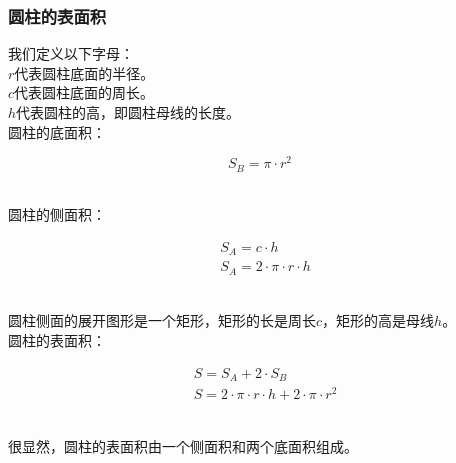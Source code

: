 \documentclass[UTF8]{ctexart}
\begin{document}
\subsubsection{圆柱的表面积}
    我们定义以下字母：\\[3mm]
    $r$代表圆柱底面的半径。\\[3mm]
    $c$代表圆柱底面的周长。\\[3mm]
    $h$代表圆柱的高，即圆柱母线的长度。\\[6mm]
    圆柱的底面积：
    \begin{large}
        \begin{equation*}
            S_B=\pi\cdot r^2
        \end{equation*}
    \end{large}\\
    圆柱的侧面积：
    \begin{large}
        \begin{align*}
            &S_A=c\cdot h\\[3mm]
            &S_A=2\cdot\pi\cdot r\cdot h
        \end{align*}
    \end{large}\\
    圆柱侧面的展开图形是一个矩形，矩形的长是周长$c$，矩形的高是母线$h$。\\[8mm]
    圆柱的表面积：
    \begin{large}
        \begin{align*}
            &S=S_A+2\cdot S_B\\[3mm]
            &S=2\cdot\pi\cdot r\cdot h+2\cdot\pi\cdot r^2
        \end{align*}
    \end{large}\\
    很显然，圆柱的表面积由一个侧面积和两个底面积组成。    

\newpage
\end{document}
